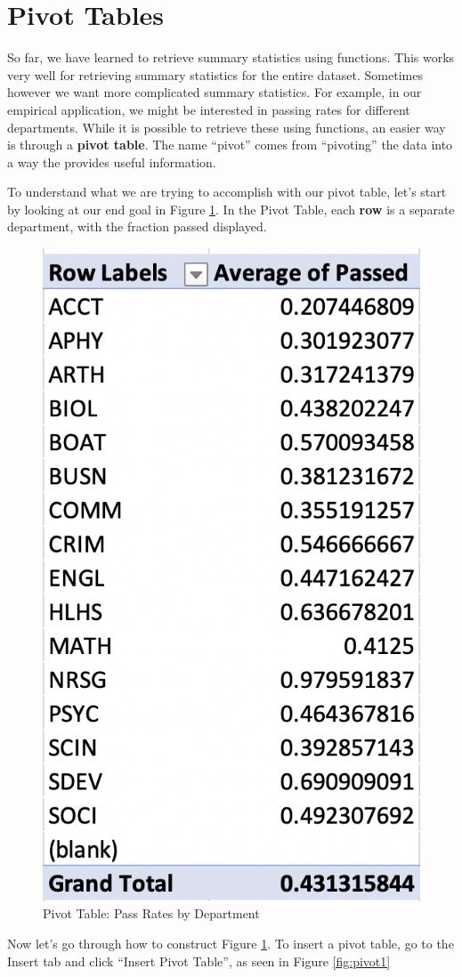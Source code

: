 \documentclass[
]{book}
\begin{document}
\hypertarget{heading.pivottables}{%
\section{Pivot Tables}\label{heading.pivottables}}

So far, we have learned to retrieve summary statistics using functions. This works very well for retrieving summary statistics for the entire dataset. Sometimes however we want more complicated summary statistics. For example, in our empirical application, we might be interested in passing rates for different departments. While it is possible to retrieve these using functions, an easier way is through a \textbf{pivot table}. The name ``pivot'' comes from ``pivoting'' the data into a way the provides useful information.

To understand what we are trying to accomplish with our pivot table, let's start by looking at our end goal in Figure \ref{fig:pivotfinal}. In the Pivot Table, each \textbf{row} is a separate department, with the fraction passed displayed.

\begin{figure}

{\centering \includegraphics[width=0.38\linewidth]{images/01_pivot_final} 

}

\caption{Pivot Table: Pass Rates by Department}\label{fig:pivotfinal}
\end{figure}

Now let's go through how to construct Figure \ref{fig:pivotfinal}. To insert a pivot table, go to the Insert tab and click ``Insert Pivot Table'', as seen in Figure \ref{fig:pivot1}
\end{document}
